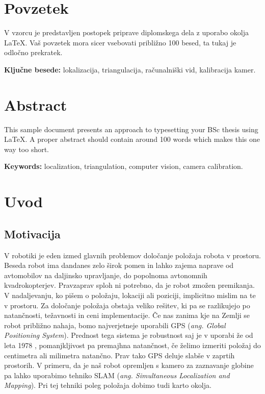 \documentclass[a4paper, 12pt]{book}
\newcommand{\tkeywords}{lokalizacija, triangulacija, računalniški vid, kalibracija kamer}
\newcommand{\tkeywordsEn}{localization, triangulation, computer vision, camera calibration}
\newcommand{\clearemptydoublepage}{\newpage{\pagestyle{empty}\cleardoublepage}}
\begin{document}
\clearemptydoublepage

\chapter*{Povzetek}
V vzorcu je predstavljen postopek priprave diplomskega dela z uporabo okolja \LaTeX. Vaš povzetek mora sicer vsebovati približno 100 besed, ta tukaj je odločno prekratek.
\bigskip

\noindent\textbf{Ključne besede:} \tkeywords.
\clearemptydoublepage

\chapter*{Abstract}
This sample document presents an approach to typesetting your BSc thesis using \LaTeX. A proper abstract should contain around 100 words which makes this one way too short.
\bigskip

\noindent\textbf{Keywords:} \tkeywordsEn.
\clearemptydoublepage

\mainmatter
\setcounter{page}{1}
\pagestyle{fancy}

\chapter{Uvod}
\section{Motivacija}
V robotiki je eden izmed glavnih problemov določanje položaja robota v prostoru. Beseda robot ima dandanes zelo širok pomen in lahko zajema naprave od avtomobilov na daljinsko upravljanje, do popolnoma avtonomnih kvadrokopterjev. Pravzaprav sploh ni potrebno, da je robot zmožen premikanja. V nadaljevanju, ko pišem o položaju, lokaciji ali poziciji, implicitno mislim na te v prostoru. Za določanje položaja obstaja veliko rešitev, ki pa se razlikujejo po natančnosti, težavnosti in ceni implementacije. Če nas zanima kje na Zemlji se robot približno nahaja, bomo najverjetneje uporabili GPS (\emph{ang. Global Positioning System}). Prednost tega sistema je robustnost saj je v uporabi že od leta 1978 \cite{wiki:gps}, pomanjkljivost pa premajhna natančnost, če želimo izmeriti položaj do centimetra ali milimetra natančno. Prav tako GPS deluje slabše v zaprtih prostorih. V primeru, da je naš robot opremljen s kamero za zaznavanje globine pa lahko uporabimo tehniko SLAM (\emph{ang. Simultaneous Localization and Mapping}). Pri tej tehniki poleg položaja dobimo tudi karto okolja.
\end{document}

